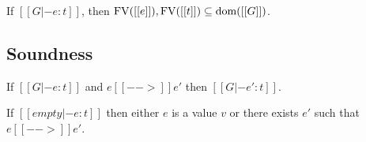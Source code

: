 \begin{lem}
If $[[G |- e:t]]$, then $\mathrm{FV}([[e]]),\mathrm{FV}([[t]]) \subseteq \mathrm{dom}([[G]])$.
\end{lem}

\begin{lem}

\end{lem}

\subsection{Soundness}
\begin{lem}
If $[[G |- e:t]]$ and $e [[-->]] e'$ then $[[G |- e':t]]$.
\end{lem}

\begin{lem}[Progress]
If $[[empty |- e:t]]$ then either $e$ is a value $v$ or there exists $e'$ such that $e [[-->]] e'$.
\end{lem}

